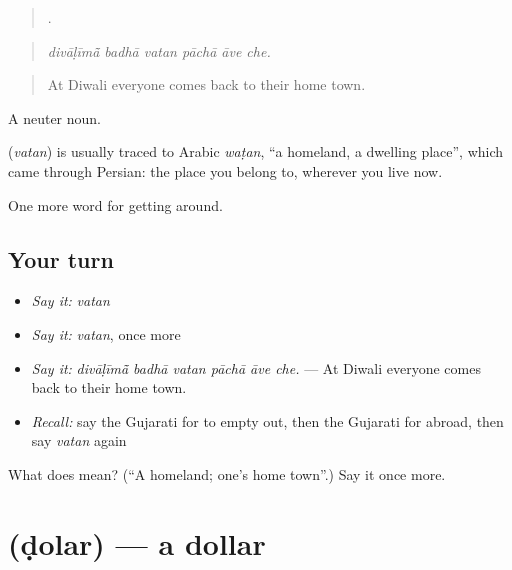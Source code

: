 \begin{quote}
     .
\end{quote}

\begin{quote}
\emph{divāḷīmā̃ badhā vatan pāchā āve che.}
\end{quote}

\begin{quote}
At Diwali everyone comes back to their home town.
\end{quote}

A neuter noun.

\begin{cousinweb}
\textbf{} (\emph{vatan}) is usually traced to Arabic \emph{waṭan}, \textquotedblleft{}a homeland, a dwelling place\textquotedblright{}, which came through Persian: the place you belong to, wherever you live now.
\end{cousinweb}

\begin{grammarlens}[title={What you've built}]
One more word for getting around.
\end{grammarlens}

\subsection*{Your turn}
\begin{itemize}
\raggedright
  \item \emph{Say it:} \emph{vatan}
  \item \emph{Say it:} \emph{vatan}, once more
  \item \emph{Say it:} \emph{divāḷīmā̃ badhā vatan pāchā āve che.} — At Diwali everyone comes back to their home town.
  \item \emph{Recall:} say the Gujarati for to empty out, then the Gujarati for abroad, then say \emph{vatan} again
\end{itemize}

\begin{tcolorbox}[breakable,colback=teal!4,colframe=teal!35!black,title={Before you move on}]
What does  mean? (\textquotedblleft{}A homeland; one's home town\textquotedblright{}.) Say it once more.
\end{tcolorbox}
\section[\texorpdfstring{\gu{ડોલર} (ḍolar)}{ડોલર (ḍolar)}]{ (ḍolar) — a dollar}

